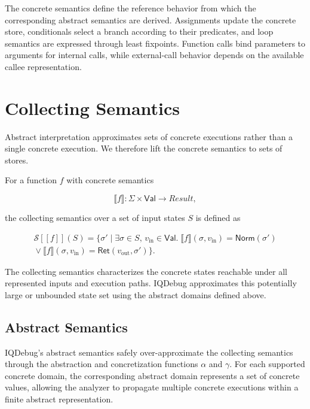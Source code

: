 \documentclass[11pt,oneside]{report}
\theoremstyle{plain}
\theoremstyle{definition}
\theoremstyle{remark}
\newcommand{\Norm}{\mathsf{Norm}}
\newcommand{\Ret}{\mathsf{Ret}}
\begin{document}
The concrete semantics define the reference behavior from which the corresponding abstract semantics are derived.
Assignments update the concrete store, conditionals select a branch according to their predicates, and loop semantics are expressed through least fixpoints.
Function calls bind parameters to arguments for internal calls, while external-call behavior depends on the available callee representation.

\section{Collecting Semantics}

Abstract interpretation approximates sets of concrete executions rather than a single concrete execution.
We therefore lift the concrete semantics to sets of stores.

For a function \(f\) with concrete semantics

$$ \llbracket f \rrbracket : \Sigma \times \mathsf{Val} \rightarrow \mathit{Result}, $$

the collecting semantics over a set of input states \(S\) is defined as

\begin{multline*}
\mathcal{S}[[f]](S) = \{ \sigma' \mid \exists \sigma \in S,\, v_{\mathrm{in}}\in\mathsf{Val}. \;
\llbracket f\rrbracket(\sigma,v_{\mathrm{in}}) = \Norm(\sigma') \\
{}\vee \llbracket f\rrbracket(\sigma,v_{\mathrm{in}}) = \Ret(v_{\mathrm{out}},\sigma') \}.
\end{multline*}

The collecting semantics characterizes the concrete states reachable under all represented inputs and execution paths.
IQDebug approximates this potentially large or unbounded state set using the abstract domains defined above.

\subsection{Abstract Semantics}

IQDebug's abstract semantics safely over-approximate the collecting semantics through the abstraction and concretization functions \(\alpha\) and \(\gamma\).
For each supported concrete domain, the corresponding abstract domain represents a set of concrete values, allowing the analyzer to propagate multiple concrete executions within a finite abstract representation.
\end{document}
